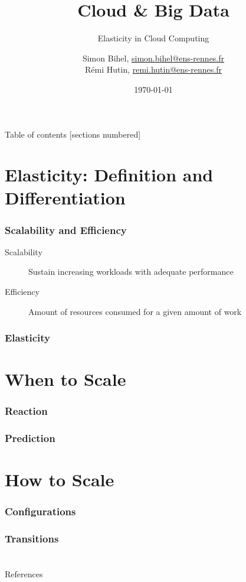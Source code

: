 \documentclass{beamer}
\title{Cloud \& Big Data}
\subtitle{Elasticity in Cloud Computing}
\date{\today}
\author{%
  Simon Bihel, \url{simon.bihel@ens-rennes.fr} \\
  Rémi Hutin, \url{remi.hutin@ens-rennes.fr}
}
\institute{%
  University of Rennes I \\
  École normale supérieure de Rennes
}
\begin{document}
\maketitle

\begin{frame}{Table of contents}
  [sections numbered]
  \tableofcontents[hideallsubsections]
\end{frame}


\section{Elasticity: Definition and Differentiation}
\begin{frame}
  \frametitle{Scalability and Efficiency \cite{herbst2013elasticity}}
  \begin{description}
    \item[Scalability] Sustain increasing workloads with adequate performance
    \item[Efficiency] Amount of resources consumed for a given amount of work
  \end{description}
\end{frame}

\begin{frame}
  \frametitle{Elasticity \cite{herbst2013elasticity} \cite{galante2012survey} \cite{gulati2011cloud} \cite{sharma2011cost} \cite{moore2013coordinated}}
\end{frame}


\section{When to Scale}
\begin{frame}
  \frametitle{Reaction}
\end{frame}

\begin{frame}
  \frametitle{Prediction}
\end{frame}


\section{How to Scale}
\begin{frame}
  \frametitle{Configurations}
\end{frame}

\begin{frame}
  \frametitle{Transitions}
\end{frame}


\appendix
\section*{}
\begin{frame}[allowframebreaks]{References}
  
  
\end{frame}
\end{document}
